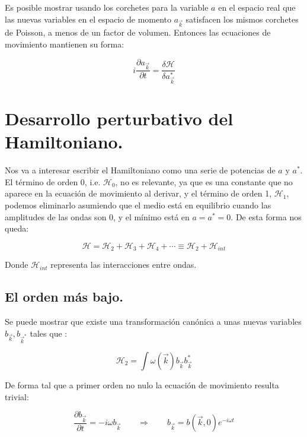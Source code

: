 Es posible mostrar usando los corchetes para la variable $a$ en el espacio real que las nuevas variables en el espacio de momento $a_{\vec k}$ satisfacen los mismos corchetes de Poisson, a menos de un factor de volumen. Entonces las ecuaciones de movimiento mantienen su forma:

\begin{equation}
	i\frac{\partial a_{\vec k}}{\partial t} = \frac{\delta \mathcal{H}}{\delta a_{\vec k}^*}
\end{equation}


\section{Desarrollo perturbativo del Hamiltoniano.}
Nos va a interesar escribir el Hamiltoniano como una serie de potencias de $a$ y $a^*$. El término de orden 0, i.e. $\mathcal{H}_0$, no es relevante, ya que es una constante que no aparece en la ecuación de movimiento al derivar, y el término de orden 1, $\mathcal{H}_1$, podemos eliminarlo asumiendo que el medio está en equilibrio cuando las amplitudes de las ondas son 0, y el mínimo está en $a=a^*=0$. De esta forma nos queda:

\begin{equation}
	\mathcal{H} = \mathcal{H}_2 + \mathcal{H}_3 + \mathcal{H}_4 + \cdots \equiv \mathcal{H}_2 + \mathcal{H}_{int}
\end{equation}

Donde $\mathcal{H}_{int}$ representa las interacciones entre ondas. 
\subsection*{El orden más bajo.}

Se puede mostrar que existe una transformación canónica a unas nuevas variables $b_{\vec{k}},b_{\vec{k}^*}$ tales que \cite{zakharovKolmogorovSpectraTurbulence1992}:

\begin{equation}
	\mathcal{H}_2 = \int \omega(\vec k)b_{\vec k}b^*_{\vec k}
\end{equation} 

De forma tal que a primer orden no nulo la ecuación de movimiento resulta trivial:

\begin{equation}
	\frac{\partial b_{\vec{k}}}{\partial t}=-i\omega b_{\vec{k}} \qquad \Rightarrow{} \qquad b_{\vec{k}}=b(\vec k, 0)e^{-i\omega t}
\end{equation}

